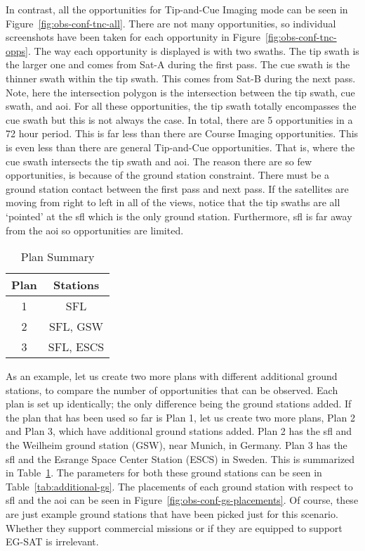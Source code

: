 In contrast, all the opportunities for Tip-and-Cue Imaging mode can be seen in
Figure~\ref{fig:obs-conf-tnc-all}. There are not many opportunities, so
individual screenshots have been taken for each opportunity in
Figure~\ref{fig:obs-conf-tnc-opps}. The way each opportunity is displayed is
with two swaths.  The tip swath is the larger one and comes from Sat-A during
the first pass. The cue swath is the thinner swath within the tip swath. This
comes from Sat-B during the next pass. Note, here the intersection polygon is
the intersection between the tip swath, cue swath, and \gls{aoi}. For all these
opportunities, the tip swath totally encompasses the cue swath but this is not
always the case. In total, there are 5 opportunities in a 72 hour period. This
is far less than there are Course Imaging opportunities. This is even less than
there are general Tip-and-Cue opportunities. That is, where the cue swath
intersects the tip swath and \gls{aoi}. The reason there are so few
opportunities, is because of the ground station constraint. There must be a
ground station contact between the first pass and next pass. If the satellites
are moving from right to left in all of the views, notice that the tip swaths
are all `pointed' at the \gls{sfl} which is the only ground station.
Furthermore, \gls{sfl} is far away from the \gls{aoi} so opportunities are
limited.


\begin{table}[h] 
    \centering
    \caption{Plan Summary}
    \begin{tabular}{cc}
	Plan & Stations \\ \hline
	1   &	SFL \\
	2   &	SFL, GSW \\
	3   &	SFL, ESCS 
    \end{tabular}
    \label{tab:additional-plans}
\end{table}

As an example, let us create two more plans with different additional ground
stations, to compare the number of opportunities that can be observed. Each plan is
set up identically; the only difference being the ground stations added. If the
plan that has been used so far is Plan 1, let us create two more plans,
Plan 2 and Plan 3, which have additional ground stations added.  Plan 2 has the
\gls{sfl} and the Weilheim ground station (GSW), near Munich, in Germany. Plan
3 has the \gls{sfl} and the Esrange Space Center Station (ESCS) in Sweden. This
is summarized in Table~\ref{tab:additional-plans}. The parameters for both
these ground stations can be seen in Table~\ref{tab:additional-gs}. The
placements of each ground station with respect to \gls{sfl} and the \gls{aoi}
can be seen in Figure~\ref{fig:obs-conf-gs-placements}. Of course, these are
just example ground stations that have been picked just for this scenario.
Whether they support commercial missions or if they are equipped to support
EG-SAT is irrelevant.  

